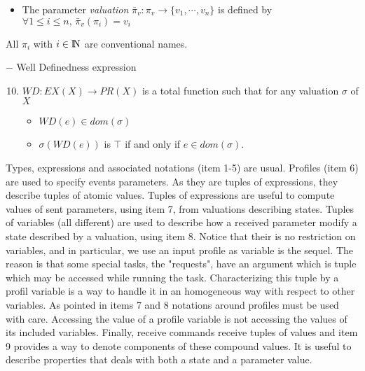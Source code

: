 \documentclass{article}
\newcommand{\NAT}{\mbox{\normalfont I$\!$N}}
\begin{document}
\begin{definition}
\begin{enumerate}
\begin{itemize}
\item The parameter {\em valuation} $\bar\pi_v:\pi_v\rightarrow\{v_1,\cdots,v_n\}$ is defined by $\forall 1\leq i\leq n,\, \bar\pi_v(\pi_i)=v_i$
\end{itemize}
All $\pi_i$ with $i\in\NAT$ are conventional names.
\end{enumerate}
$-$ Well Definedness expression
\begin{enumerate}\setcounter{enumi}{9}
\item $W\!D:EX(X)\rightarrow P\!R(X)$ is a total function such that for any valuation $\sigma$ of $X$
      \begin{itemize}
			\item $W\!D(e)\in dom(\sigma)$
			\item $\sigma(W\!D(e))$ is $\top$ if and only if $e\in dom(\sigma)$.
			\end{itemize}
\end{enumerate}
\end{definition}
Types, expressions and associated notations (item 1-5) are usual. Profiles (item 6) are used to specify events parameters. As they are tuples of expressions, they describe tuples of atomic values. Tuples of expressions are useful to compute values of sent parameters, using item 7, from valuations describing states. Tuples of variables (all different) are used to describe how a received parameter modify a state described by a valuation, using item 8. Notice that their is no restriction on variables, and in particular, we use an input profile as variable is the sequel. The reason is that some special tasks, the "requests", have an argument which is tuple which may be accessed while running the task. Characterizing this tuple by a profil variable is a way to handle it in an homogeneous way with respect to other variables. As pointed in items 7 and 8 notations around profiles must be used with care. Accessing the value of a profile variable is not accessing the values of its included variables. Finally, receive commands receive tuples of values and item 9 provides a way to denote components of these compound values. It is useful to describe properties that deals with both a state and a parameter value.
\end{document}
